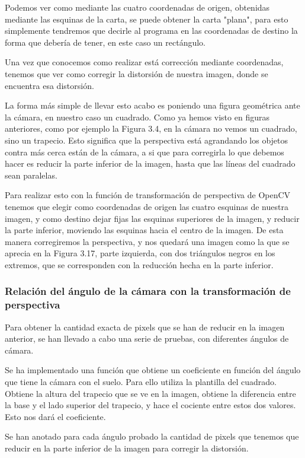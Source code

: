 Podemos ver como mediante las cuatro coordenadas de origen, obtenidas mediante las esquinas de la carta, se puede obtener la carta "plana", para esto simplemente tendremos que decirle al programa en las coordenadas de destino la forma que debería de tener, en este caso un rectángulo.

Una vez que conocemos como realizar está corrección mediante coordenadas, tenemos que ver como corregir la distorsión de nuestra imagen, donde se encuentra esa distorsión.

La forma más simple de llevar esto acabo es poniendo una figura geométrica ante la cámara, en nuestro caso un cuadrado. Como ya hemos visto en figuras anteriores, como por ejemplo la Figura 3.4, en la cámara no vemos un cuadrado, sino un trapecio. Esto significa que la perspectiva está agrandando los objetos contra más cerca están de la cámara, a si que para corregirla lo que debemos hacer es reducir la parte inferior de la imagen, hasta que las líneas del cuadrado sean paralelas.

Para realizar esto con la función de transformación de perspectiva de OpenCV tenemos que elegir como coordenadas de origen las cuatro esquinas de nuestra imagen, y como destino dejar fijas las esquinas superiores de la imagen, y reducir la parte inferior, moviendo las esquinas hacia el centro de la imagen\cite{coord_persp}. De esta manera corregiremos la perspectiva, y nos quedará una imagen como la que se aprecia en la Figura 3.17, parte izquierda, con dos triángulos negros en los extremos, que se corresponden con la reducción hecha en la parte inferior. 

\subsubsection{Relación del ángulo de la cámara con la transformación de perspectiva}

Para obtener la cantidad exacta de pixels que se han de reducir en la imagen anterior, se han llevado a cabo una serie de pruebas, con diferentes ángulos de cámara.

Se ha implementado una función que obtiene un coeficiente en función del ángulo que tiene la cámara con el suelo. Para ello utiliza la plantilla del cuadrado. Obtiene la altura del trapecio que se ve en la imagen, obtiene la diferencia entre la base y el lado superior del trapecio, y hace el cociente entre estos dos valores. Esto nos dará el coeficiente.

Se han anotado para cada ángulo probado la cantidad de pixels que tenemos que reducir en la parte inferior de la imagen para corregir la distorsión.

